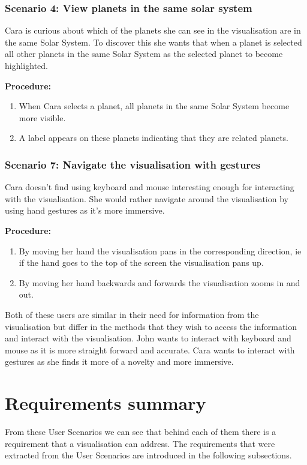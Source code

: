  \subsubsection{Scenario 4: View planets in the same solar system}
Cara is curious about which of the planets she can see in the
visualisation are in the same Solar System. To discover this she wants that when
a planet is selected all other planets in the same Solar System as the selected
planet to become highlighted.
 
  {\bf  Procedure:}
   \begin{enumerate}
 \item When Cara selects a planet, all planets in the same Solar System become
more visible.
 \item A label appears on these planets indicating that they are related
planets.
 \end{enumerate}

 \subsubsection{Scenario 7: Navigate the visualisation with gestures}
Cara doesn't find using keyboard and mouse interesting enough for interacting
with the visualisation. She would rather navigate around the visualisation by
using hand
gestures as it's more immersive.

  {\bf  Procedure:}
   \begin{enumerate}
 \item By moving her hand the visualisation pans
in the corresponding direction, ie if the hand goes to the top of the screen
the visualisation pans up.
 \item By moving her hand backwards and forwards the visualisation zooms in
and out.
  \end{enumerate}
Both of these users are similar in their need for information from the
visualisation but differ in the methods that they wish to access the information
and interact with the visualisation. John wants to interact with keyboard and
mouse as it is more straight forward and accurate. Cara wants to interact with
gestures as she finds it more of a novelty and more immersive.
  
\section{Requirements summary}
From these User Scenarios we can see that behind each of them there is a
requirement that a visualisation can address. The requirements that were
extracted from the User Scenarios are introduced in the following subsections. 
